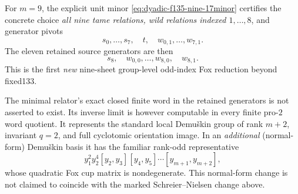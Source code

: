 \begin{theorem}
For $m=9$,
the explicit
unit minor
\eqref{eq:dyadic-f135-nine-17minor}
certifies the
concrete choice
\emph{all nine tame
relations, wild
relations indexed
$1,\ldots,8$},
and generator
pivots
\[
s_0,\ldots,s_7,\quad
t,\quad
w_{0,1},\ldots,w_{7,1}.
\]
The eleven
retained
source generators
are then
\begin{equation}\label{eq:dyadic-f135-nine-retained-generators}
\boxed{\qquad
s_8,\quad
w_{0,0},\ldots,w_{8,0},
\quad w_{8,1}.
\qquad}
\end{equation}
This is the first
\emph{new}
nine-sheet
group-level
odd-index Fox
reduction
beyond fixed133.

The minimal
relator's exact
closed finite
word in the
retained
generators is
not asserted
to exist.
Its inverse
limit is however
computable
in every finite
pro-$2$ word
quotient.
It represents
the standard
local Demu\v{s}kin
group of
rank $m+2$,
invariant $q=2$,
and full
cyclotomic
orientation image.
In an
\emph{additional}
(normal-form)
Demu\v{s}kin
basis it has
the familiar
rank-odd
representative
\begin{equation}\label{eq:dyadic-f135-standard-3power-normal-form}
y_1^2y_2^4
[y_2,y_3]
[y_4,y_5]\cdots
[y_{m+1},y_{m+2}],
\end{equation}
whose quadratic
Fox cup matrix
is nondegenerate.
This normal-form
change is not
claimed to
coincide with
the marked
Schreier--Nielsen
change above.
\end{theorem}

